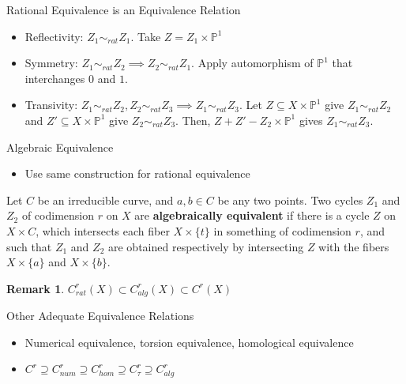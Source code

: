 \begin{frame}{Rational Equivalence is an Equivalence Relation}
  \begin{itemize}
    \item Reflectivity: $Z_1 \sim_{rat} Z_1$. Take $Z = Z_1 \times \mathbb{P}^1$ \pause
    \item Symmetry: $Z_1 \sim_{rat} Z_2 \implies Z_2 \sim_{rat} Z_1$. Apply automorphism of $\mathbb{P}^1$ that 
      interchanges $0$ and $1$. \pause
    \item Transivity: $Z_1 \sim_{rat} Z_2, Z_2 \sim_{rat} Z_3 \implies Z_1 \sim_{rat} Z_3$. Let $Z \subseteq 
      X \times \mathbb{P}^1$ give $Z_1 \sim_{rat} Z_2$ and $Z' \subseteq X \times \mathbb{P}^1$ give $Z_2 \sim_{rat}
      Z_3$. Then, $Z+Z'-Z_2 \times \mathbb{P}^1$ gives $Z_1 \sim_{rat} Z_3$. 
  \end{itemize}
\end{frame}

\newtheorem*{remark}{Remark}
\begin{frame}{Algebraic Equivalence}
   \begin{itemize}
    \item Use same construction for rational equivalence \pause
  \end{itemize}
  \begin{definition}
    Let $C$ be an irreducible curve, and $a, b \in C$ be any two points. 
    Two cycles $Z_1$ and $Z_2$ of codimension $r$ on $X$ are \textbf{algebraically equivalent} if there is a cycle
    $Z$ on $X \times C$, which intersects each fiber $X \times \{t\}$ in something of codimension $r$, and
    such that $Z_1$ and $Z_2$ are obtained respectively by intersecting $Z$ with the fibers $X\times\{a\}$ 
    and $X\times\{b\}$.
  \end{definition}\pause
  \begin{remark}
    $C^r_{rat}(X) \subset C^r_{alg}(X) \subset C^r(X)$
  \end{remark}
  
\end{frame}

\begin{frame}{Other Adequate Equivalence Relations}
  \begin{itemize}
    \item Numerical equivalence, torsion equivalence, homological equivalence \pause
    \item $C^r \supseteq C^r_{num} \supseteq C^r_{hom} \supseteq C^r_{\tau} \supseteq C^r_{alg}$
  \end{itemize}
\end{frame}

